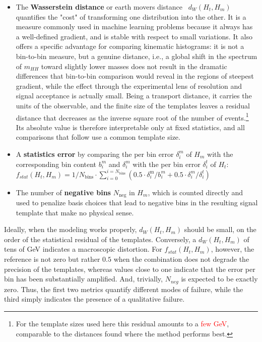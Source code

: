 \begin{itemize}
    \item The \textbf{Wasserstein distance} or earth movers distance~\cite{ramdas2015wassersteinsampletestingrelated,2020SciPy-NMeth} $d_W(H_{t},H_{m})$ quantifies the "cost" of transforming one distribution into the other. It is a measure commonly used in machine learning problems because it always has a well-defined gradient, and is stable with respect to small variations. It also offers a specific advantage for comparing kinematic histograms: it is not a bin-to-bin measure, but a genuine distance, i.e., a global shift in the spectrum of $m_{HH}$ toward slightly lower masses does not result in the dramatic differences that bin-to-bin comparison would reveal in the regions of steepest gradient, while the effect through the experimental lens of resolution and signal acceptance is actually small. Being a transport distance, it carries the units of the observable, and the finite size of the templates leaves a residual distance that decreases as the inverse square root of the number of events.\footnote{For the template sizes used here this residual amounts to a \textcolor{red}{few GeV}, comparable to the distances found where the method performs best.} Its absolute value is therefore interpretable only at fixed statistics, and all comparisons that follow use a common template size.
    \item A \textbf{statistics error} by comparing the per bin error $\delta_i^{m}$ of $H_{m}$ with the corresponding bin content $b_i^{m}$ and $\delta_i^{m}$ with the per bin error $\delta_i^{t}$ of $H_{t}$:\\ $f_{stat}(H_{t},H_{m})=1/N_\text{bins}\cdot\sum_{i=0}^{i=N_\text{bins}}(0.5\cdot\delta_i^\text{m}/b_i^{m} +0.5\cdot\delta_i^{m}/\delta_i^{t})$
    \item The number of \textbf{negative bins} $N_{\text{neg}}$ in $H_m$, which is counted directly and used to penalize basis choices that lead to negative bins in the resulting signal template that make no physical sense.
\end{itemize}
%

Ideally, when the modeling works properly, $d_W(H_{t},H_{m})$ should be small, on the order of the statistical residual of the templates. Conversely, a $d_W(H_{t},H_{m})$ of tens of GeV indicates a macroscopic distortion. For $f_{stat}(H_{t},H_{m})$, however, the reference is not zero but rather $0.5$ when the combination does not degrade the precision of the templates, whereas values close to one indicate that the error per bin has been substantially amplified. And, trivially, $N_{neg}$ is expected to be exactly zero. Thus, the first two metrics quantify different modes of failure, while the third simply indicates the presence of a qualitative failure.

